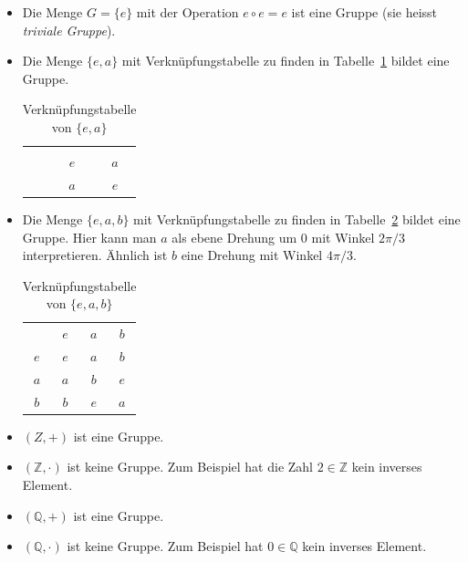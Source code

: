\documentclass[../main.tex]{subfiles}
\begin{document}
\begin{examples}
  \leavevmode
  \begin{itemize}
    \item Die Menge $G = \{e\}$ mit der Operation
      $e \circ e = e$ ist eine Gruppe (sie heisst \textit{triviale Gruppe}).
    \item Die Menge $\{e, a\}$ mit Verknüpfungstabelle zu finden
      in Tabelle~\ref{tab:ea} bildet eine Gruppe.
      \begin{table}[htb]
        \centering
        \begin{tabular}[h]{ccc}
         & \color{gray}{$e$} & \color{gray}{ $a$ }\\
        \color{gray}{$e$} & $e$ & $a$ \\
        \color{gray}{$a$} & $a$ & $e$
        \end{tabular}
        \caption{Verknüpfungstabelle von $\{e, a\}$}%
        \label{tab:ea}
      \end{table}

    \item Die Menge $\{e, a, b\}$ mit Verknüpfungstabelle zu finden
      in Tabelle~\ref{tab:eab} bildet eine Gruppe.
      Hier kann man $a$ als ebene Drehung um $0$ mit Winkel $2\pi/3$
      interpretieren. Ähnlich ist $b$ eine Drehung mit
      Winkel $4\pi/3$.
      \begin{table}[htb]
        \centering
        \begin{tabular}[h]{cccc}
        & \color{gray}$e$ & \color{gray}$a$ & \color{gray}$b$\\
        \color{gray}$e$ & $e$ & $a$ & $b$\\
        \color{gray}$a$ & $a$ & $b$ & $e$ \\
        \color{gray}$b$ & $b$ & $e$ & $a$
        \end{tabular}
        \caption{Verknüpfungstabelle von $\{e, a, b\}$}%
        \label{tab:eab}
      \end{table}
      \item $(Z, +)$ ist eine Gruppe.
      \item $(\mathbb Z, \cdot)$ ist keine Gruppe. Zum Beispiel hat die Zahl
      $2 \in \mathbb Z$ kein inverses Element.
      \item $(\mathbb Q, +)$ ist eine Gruppe.
      \item $(\mathbb Q, \cdot)$ ist keine Gruppe. Zum Beispiel hat $0 \in \mathbb Q$
      kein inverses Element.
  \end{itemize}
\end{examples}
\end{document}
